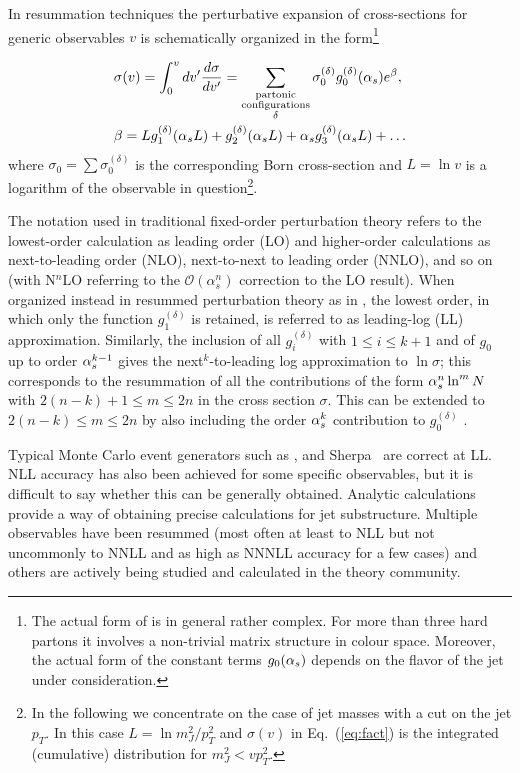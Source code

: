 In resummation techniques the perturbative expansion of cross-sections 
for generic observables $v$ is schematically organized in the form\footnote{The 
actual form of  is in general rather complex. For more 
than three hard partons it involves a non-trivial matrix structure
in colour space. 
Moreover, the actual form of the constant terms $g_0(\alpha_s)$ depends 
on the flavor of the jet under consideration.}


\begin{align}
%  
& \sigma(v) =\int_0^v dv' \frac{d\sigma}{dv'} = \sum_{\begin{subarray}{c}
\text{partonic}\\ \text{configurations}\\ \delta
      \end{subarray}}
       \sigma_0^{(\delta)} g_0^{(\delta)}(\as) e^{\beta},  
\label{eq:fact}
       \\
      & \beta = {Lg_1^{(\delta)}(\alpha_s L)+g_2^{(\delta)}(\alpha_s L) +\as g_3^{(\delta)}(\alpha_s L) +\dots}
\label{eqresum}
\end{align}
where $\sigma_0=\sum \sigma_0^{(\delta)}$ is the corresponding Born 
cross-section and
$L = \ln v$ is a logarithm of the observable in question\footnote{In the following we concentrate on the case of jet masses with a cut on the jet $p_T$. 
In this case $L=\ln m_J^2/p_T^2$ and $\sigma(v)$ in Eq.~(\ref{eq:fact}) 
is the integrated (cumulative) distribution for $m_J^2< v p_T^2$.}. 

 The notation used in traditional 
fixed-order perturbation theory refers to the lowest-order calculation as 
leading order (LO) and higher-order calculations as next-to-leading order 
(NLO), next-to-next to leading order (NNLO), and so on (with N${^n}$LO 
referring to the $\mathcal{O}(\alpha_s^n)$ correction to the LO result). 
When organized instead in resummed perturbation theory as in , 
the lowest order, in which only the function $g_1^{(\delta)}$ is retained, 
is referred to as leading-log (LL) approximation. 
Similarly, the inclusion of all $g_i^{(\delta)}$ with $1\leq i\leq k+1$ 
and of $g_0$ up to order $\alpha_s^{k-1}$ gives the next$^k$-to-leading log 
approximation to $\ln \sigma$; this corresponds to the resummation of 
all the contributions of the form $\alpha_s^n \ln^m N$
with $2(n-k)+1\le m\le 2n$ in the cross section $\sigma$. This can be 
extended to $2(n-k)\le m\le
2n$ by also including the order $\alpha_s^k$ contribution to $g_0^{(\delta)}$ . 


Typical Monte Carlo event generators such as \pythia, \hpp and
Sherpa~\cite{Gleisberg:2008ta} are correct at LL. 
NLL accuracy has also been achieved for some specific observables, 
but it is difficult to say whether this can be generally obtained. 
Analytic calculations provide a way of obtaining 
precise calculations for jet substructure.
Multiple observables have been resummed (most often at least to NLL 
but not uncommonly to NNLL and as high as  NNNLL accuracy for a few cases) 
and others are actively being studied and calculated in the theory community.

